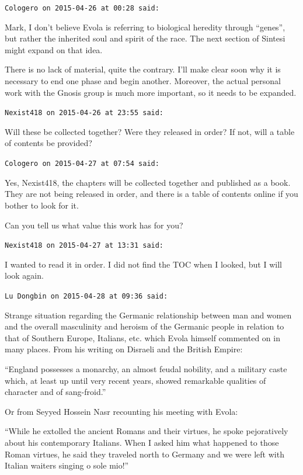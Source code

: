 \begin{footnotesize}
\begin{sffamily}
\hfill

\texttt{Cologero on 2015-04-26 at 00:28 said:}

Mark, I don't believe Evola is referring to biological heredity through ``genes'', but rather the inherited soul and spirit of the race. The next section of Sintesi might expand on that idea.

There is no lack of material, quite the contrary. I'll make clear soon why it is necessary to end one phase and begin another. Moreover, the actual personal work with the Gnosis group is much more important, so it needs to be expanded.

\hfill

\texttt{Nexist418 on 2015-04-26 at 23:55 said:}

Will these be collected together? Were they released in order? If not, will a table of contents be provided?

\hfill

\texttt{Cologero on 2015-04-27 at 07:54 said:}

Yes, Nexist418, the chapters will be collected together and published as a book. They are not being released in order, and there is a table of contents online if you bother to look for it.

Can you tell us what value this work has for you?

\hfill

\texttt{Nexist418 on 2015-04-27 at 13:31 said:}

I wanted to read it in order. I did not find the TOC when I looked, but I will look again.

\hfill

\texttt{Lu Dongbin on 2015-04-28 at 09:36 said:}

Strange situation regarding the Germanic relationship between man and women and the overall masculinity and heroism of the Germanic people in relation to that of Southern Europe, Italians, etc. which Evola himself commented on in many places. From his writing on Disraeli and the British Empire:

``England possesses a monarchy, an almost feudal nobility, and a military caste which, at least up until very recent years, showed remarkable qualities of character and of sang-froid.''

Or from Seyyed Hossein Nasr recounting his meeting with Evola:

``While he extolled the ancient Romans and their virtues, he spoke pejoratively about his contemporary Italians. When I asked him what happened to those Roman virtues, he said they traveled north to Germany and we were left with Italian waiters singing o sole mio!''


\end{sffamily}
\end{footnotesize}
